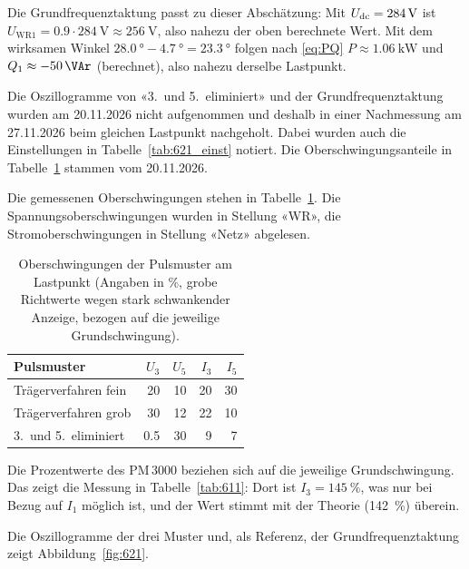 Die Grundfrequenztaktung passt zu dieser Abschätzung: Mit $U_{\mathrm{dc}}=\SI{284}{\volt}$ ist $U_{\mathrm{WR1}}=0.9\cdot\SI{284}{\volt}\approx\SI{256}{\volt}$, also nahezu der oben berechnete Wert. Mit dem wirksamen Winkel $\SI{28.0}{\degree}-\SI{4.7}{\degree}=\SI{23.3}{\degree}$ folgen nach \eqref{eq:PQ} $P\approx\SI{1.06}{\kilo\watt}$ und $Q_1\approx\SI{-50}{\VAr}$ (berechnet), also nahezu derselbe Lastpunkt.

Die Oszillogramme von «3.\ und 5.\ eliminiert» und der Grundfrequenztaktung wurden am 20.11.2026 nicht aufgenommen und deshalb in einer Nachmessung am 27.11.2026 beim gleichen Lastpunkt nachgeholt. Dabei wurden auch die Einstellungen in Tabelle~\ref{tab:621_einst} notiert. Die Oberschwingungsanteile in Tabelle~\ref{tab:621_harm} stammen vom 20.11.2026.

Die gemessenen Oberschwingungen stehen in Tabelle~\ref{tab:621_harm}. Die Spannungsoberschwingungen wurden in Stellung «WR», die Stromoberschwingungen in Stellung «Netz» abgelesen.

\begin{table}[htbp]
  \centering
  \caption{Oberschwingungen der Pulsmuster am Lastpunkt (Angaben in \%, grobe Richtwerte wegen stark schwankender Anzeige, bezogen auf die jeweilige Grundschwingung).}
  \label{tab:621_harm}
  \begin{tabular}{@{}lrrrr@{}}
    \toprule
    Pulsmuster & $U_3$ & $U_5$ & $I_3$ & $I_5$ \\
    \midrule
    Trägerverfahren fein & 20 & 10 & 20 & 30 \\
    Trägerverfahren grob & 30 & 12 & 22 & 10 \\
    3.\ und 5.\ eliminiert & 0.5 & 30 & 9 & 7 \\
    \bottomrule
  \end{tabular}
\end{table}

Die Prozentwerte des PM\,3000 beziehen sich auf die jeweilige Grundschwingung. Das zeigt die Messung in Tabelle~\ref{tab:611}: Dort ist $I_3=\SI{145}{\percent}$, was nur bei Bezug auf $I_1$ möglich ist, und der Wert stimmt mit der Theorie (\SI{142}{\percent}) überein.

Die Oszillogramme der drei Muster und, als Referenz, der Grundfrequenztaktung zeigt Abbildung~\ref{fig:621}.

